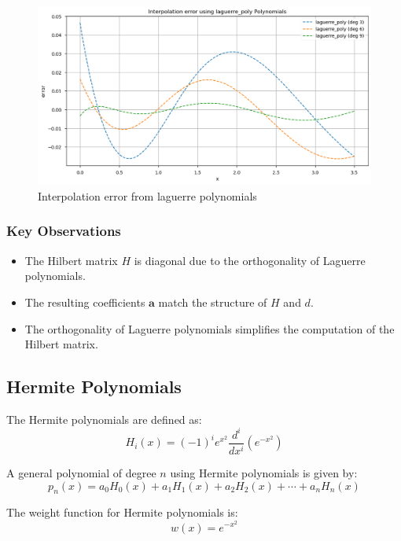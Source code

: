 \documentclass[10pt]{article}
\begin{document}
\begin{figure}[H]
    \centering
    \includegraphics[width=\imagewidth\textwidth]{figures/02_interpolation/interpolation_error_method_laguerre_poly.png}
    \caption{Interpolation error from laguerre polynomials}
\end{figure}

\subsubsection{Key Observations}
\begin{itemize}
    \item The Hilbert matrix \( H \) is diagonal due to the orthogonality of Laguerre polynomials.
    \item The resulting coefficients \( \mathbf{a} \) match the structure of \( H \) and \( d \).
    \item The orthogonality of Laguerre polynomials simplifies the computation of the Hilbert matrix.
\end{itemize}

\subsection{Hermite Polynomials}

The Hermite polynomials are defined as:
\begin{equation}
H_i(x) = (-1)^i e^{x^2} \frac{d^i}{dx^i} \left( e^{-x^2} \right)
\end{equation}

A general polynomial of degree $ n $ using Hermite polynomials is given by:
\begin{equation}
p_n(x) = a_0 H_0(x) + a_1 H_1(x) + a_2 H_2(x) + \cdots + a_n H_n(x)
\end{equation}

The weight function for Hermite polynomials is:
\begin{equation}
w(x) = e^{-x^2}
\end{equation}
\end{document}
